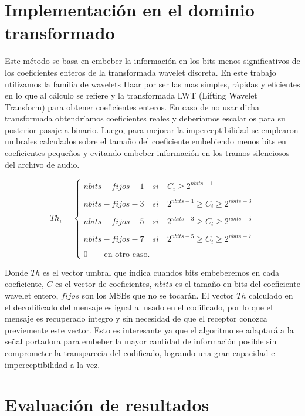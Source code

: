 \documentclass[conference,a4paper,10pt, oneside,final]{tfmpd}
\begin{document}
\section{Implementación en el dominio transformado}
Este método se basa en embeber la información en los bits menos significativos de los coeficientes enteros de la transformada wavelet discreta. 
En este trabajo utilizamos la familia de wavelets Haar por ser las mas simples, rápidas y eficientes en lo que al cálculo se refiere y la transformada LWT (Lifting Wavelet Transform) para obtener coeficientes enteros. En caso de no usar dicha transformada obtendríamos coeficientes reales y deberíamos escalarlos para su posterior pasaje a binario. 
Luego, para mejorar la imperceptibilidad se emplearon umbrales calculados sobre el tamaño del coeficiente embebiendo menos bits en coeficientes pequeños y evitando embeber información en los tramos silenciosos del archivo de audio.

{\scriptsize
$$
Th_i= \left\lbrace 
\begin{array}{ll}
 nbits - fijos -1 \quad si \quad C_i \geq 2^{nbits-1}\\
 \\
nbits - fijos -3 \quad si \quad 2^{nbits-1} \geq C_i \geq 2^{nbits-3} \\
\\
nbits - fijos -5 \quad si \quad 2^{nbits-3} \geq C_i \geq 2^{nbits-5} \\
\\
nbits - fijos -7 \quad si \quad 2^{nbits-5} \geq C_i \geq 2^{nbits-7} \\
\\
0 \qquad  \text{en otro caso.} 
\end{array}
\right.
$$
}

Donde $Th$ es el vector umbral que indica cuandos bits embeberemos en cada coeficiente, $C$ es el vector de coeficientes, $nbits$ es el tamaño en bits del coeficiente wavelet entero, $fijos$ son los MSBs que no se tocarán.
El vector $Th$ calculado en el decodificado del mensaje es igual al usado en el codificado, por lo que el mensaje es recuperado íntegro y sin necesidad de que el receptor conozca previemente este vector. Esto es interesante ya que el algoritmo se adaptará a la señal portadora para embeber la mayor cantidad de información posible sin comprometer la transparecia del codificado, logrando una gran capacidad e imperceptibilidad a la vez.

\section{Evaluación de resultados}
\end{document}
